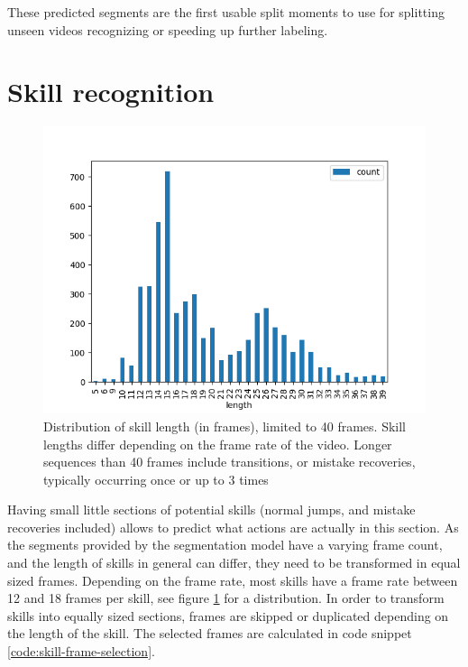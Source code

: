 These predicted segments are the first usable split moments to use for splitting unseen videos recognizing or speeding up further labeling.


\section{Skill recognition}
\label{results:recognition}

\begin{figure}
    \centering
    \includegraphics[width=0.95\linewidth]{img/skilllengths}
    \caption[frame counts of skill lengths]{Distribution of skill length (in frames), limited to 40 frames. Skill lengths differ depending on the frame rate of the video. Longer sequences than 40 frames include transitions, or mistake recoveries, typically occurring once or up to 3 times}
    \label{fig:skilllengths-counts}
\end{figure}


Having small little sections of potential skills (normal jumps, and mistake recoveries included) allows to predict what actions are actually in this section.
As the segments provided by the segmentation model have a varying frame count, and the length of skills in general can differ, they need to be transformed in equal sized frames.
Depending on the frame rate, most skills have a frame rate between 12 and 18 frames per skill, see figure \ref{fig:skilllengths-counts} for a distribution. In order to transform skills into equally sized sections, frames are skipped or duplicated depending on the length of the skill.
The selected frames are calculated in code snippet \ref{code:skill-frame-selection}.


